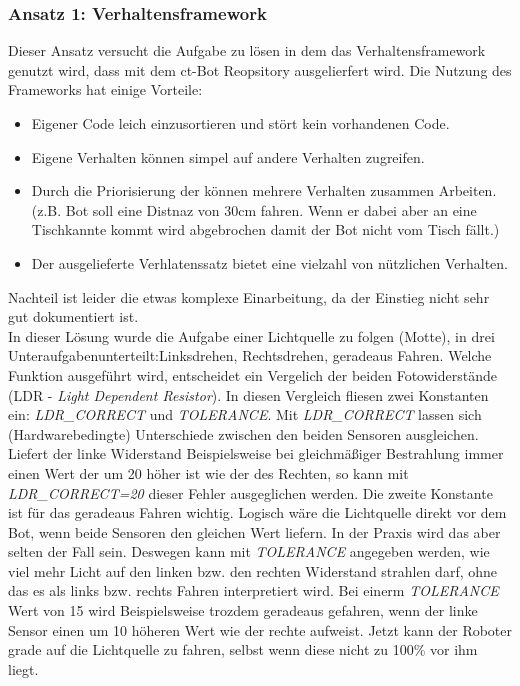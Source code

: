 \subsubsection{Ansatz 1: Verhaltensframework}
Dieser Ansatz versucht die Aufgabe zu lösen in dem das Verhaltensframework
genutzt wird, dass mit dem ct-Bot Reopsitory ausgelierfert wird. Die Nutzung des 
Frameworks hat einige Vorteile:
\begin{itemize}
	\item Eigener Code leich einzusortieren und stört kein vorhandenen Code.
	\item Eigene Verhalten können simpel auf andere Verhalten zugreifen.
	\item Durch die Priorisierung der können mehrere Verhalten zusammen Arbeiten.
		(z.B. Bot soll eine Distnaz von 30cm fahren. Wenn er dabei aber an eine
		Tischkannte kommt wird abgebrochen damit der Bot nicht vom Tisch fällt.)
	\item Der ausgelieferte Verhlatenssatz bietet eine vielzahl von nützlichen
		Verhalten.
\end{itemize}
Nachteil ist leider die etwas komplexe Einarbeitung, da der Einstieg nicht sehr gut
dokumentiert ist. \\

In dieser Lösung wurde die Aufgabe einer Lichtquelle zu folgen (Motte), in drei
Unteraufgabenunterteilt:Linksdrehen, Rechtsdrehen, geradeaus Fahren.
Welche Funktion ausgeführt wird, entscheidet ein Vergelich der beiden Fotowiderstände
(LDR - \textit{Light Dependent Resistor}). In diesen Vergleich fliesen zwei Konstanten ein:
\textit{LDR\_CORRECT} und \textit{TOLERANCE}. Mit \textit{LDR\_CORRECT} lassen sich
(Hardwarebedingte) Unterschiede zwischen den beiden Sensoren ausgleichen. Liefert
der linke Widerstand Beispielsweise bei gleichmäßiger Bestrahlung immer einen
Wert der um 20 höher ist wie der des Rechten, so kann mit \textit{LDR\_CORRECT=20} dieser
Fehler ausgeglichen werden. Die zweite Konstante ist für das geradeaus Fahren wichtig.
Logisch wäre die Lichtquelle direkt vor dem Bot, wenn beide Sensoren den gleichen
Wert liefern. In der Praxis wird das aber selten der Fall sein. Deswegen kann mit
\textit{TOLERANCE} angegeben werden, wie viel mehr Licht auf den linken bzw. den rechten
Widerstand strahlen darf, ohne das es als links bzw. rechts Fahren interpretiert wird.
Bei einerm \textit{TOLERANCE} Wert von 15 wird Beispielsweise trozdem geradeaus gefahren,
wenn der linke Sensor einen um 10 höheren Wert wie der rechte aufweist. Jetzt kann
der Roboter grade auf die Lichtquelle zu fahren, selbst wenn diese nicht zu 100\%
vor ihm liegt. \\

